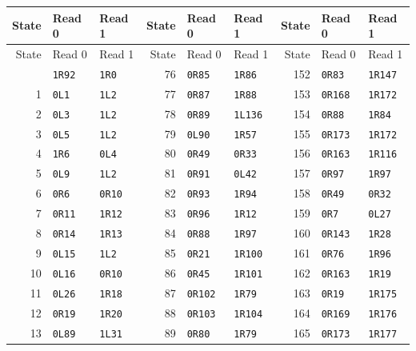 {\small\setlength{\tabcolsep}{4pt}
\begin{longtable}{@{}rll@{\hspace{8mm}}rll@{\hspace{8mm}}rll@{}}
\toprule
State & Read 0 & Read 1 & State & Read 0 & Read 1 & State & Read 0 & Read 1 \\
\midrule\endfirsthead
\toprule
State & Read 0 & Read 1 & State & Read 0 & Read 1 & State & Read 0 & Read 1 \\
\midrule\endhead
\bottomrule\endfoot
0 & \texttt{1R92} & \texttt{1R0} & 76 & \texttt{0R85} & \texttt{1R86} & 152 & \texttt{0R83} & \texttt{1R147} \\
1 & \texttt{0L1} & \texttt{1L2} & 77 & \texttt{0R87} & \texttt{1R88} & 153 & \texttt{0R168} & \texttt{1R172} \\
2 & \texttt{0L3} & \texttt{1L2} & 78 & \texttt{0R89} & \texttt{1L136} & 154 & \texttt{0R88} & \texttt{1R84} \\
3 & \texttt{0L5} & \texttt{1L2} & 79 & \texttt{0L90} & \texttt{1R57} & 155 & \texttt{0R173} & \texttt{1R172} \\
4 & \texttt{1R6} & \texttt{0L4} & 80 & \texttt{0R49} & \texttt{0R33} & 156 & \texttt{0R163} & \texttt{1R116} \\
5 & \texttt{0L9} & \texttt{1L2} & 81 & \texttt{0R91} & \texttt{0L42} & 157 & \texttt{0R97} & \texttt{1R97} \\
6 & \texttt{0R6} & \texttt{0R10} & 82 & \texttt{0R93} & \texttt{1R94} & 158 & \texttt{0R49} & \texttt{0R32} \\
7 & \texttt{0R11} & \texttt{1R12} & 83 & \texttt{0R96} & \texttt{1R12} & 159 & \texttt{0R7} & \texttt{0L27} \\
8 & \texttt{0R14} & \texttt{1R13} & 84 & \texttt{0R88} & \texttt{1R97} & 160 & \texttt{0R143} & \texttt{1R28} \\
9 & \texttt{0L15} & \texttt{1L2} & 85 & \texttt{0R21} & \texttt{1R100} & 161 & \texttt{0R76} & \texttt{1R96} \\
10 & \texttt{0L16} & \texttt{0R10} & 86 & \texttt{0R45} & \texttt{1R101} & 162 & \texttt{0R163} & \texttt{1R19} \\
11 & \texttt{0L26} & \texttt{1R18} & 87 & \texttt{0R102} & \texttt{1R79} & 163 & \texttt{0R19} & \texttt{1R175} \\
12 & \texttt{0R19} & \texttt{1R20} & 88 & \texttt{0R103} & \texttt{1R104} & 164 & \texttt{0R169} & \texttt{1R176} \\
13 & \texttt{0L89} & \texttt{1L31} & 89 & \texttt{0R80} & \texttt{1R79} & 165 & \texttt{0R173} & \texttt{1R177} \\

\end{longtable}}

